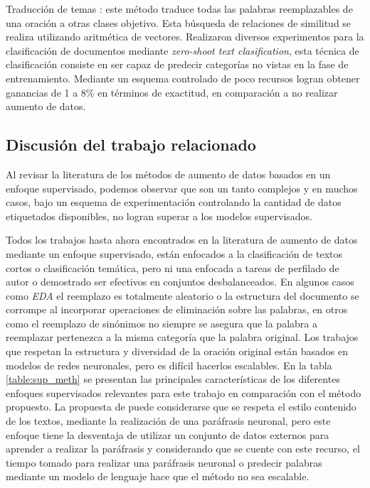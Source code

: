 Traducción de temas \citep{zhang2019integrating}: este método traduce todas las palabras reemplazables de una oración a otras clases objetivo. Esta búsqueda de relaciones de similitud se realiza utilizando aritmética de vectores. Realizaron diversos experimentos para la clasificación de documentos mediante \textit{zero-shoot text clasification}, esta técnica de clasificación consiste en ser capaz de predecir categorías no vistas en la fase de entrenamiento. Mediante un esquema controlado de poco recursos logran obtener ganancias de 1 a 8\% en términos de exactitud, en comparación a no realizar aumento de datos.


\subsection{Discusión del trabajo relacionado}

Al revisar la literatura de los métodos de aumento de datos basados en un enfoque supervisado, podemos observar que son un tanto complejos y en muchos casos, bajo un esquema de experimentación controlando la cantidad de datos etiquetados disponibles, no logran superar a los modelos supervisados.

Todos los trabajos hasta ahora encontrados en la literatura de aumento de datos mediante un enfoque supervisado, están enfocados a la clasificación de textos cortos o clasificación temática, pero ni una enfocada a tareas de perfilado de autor o demostrado ser efectivos en conjuntos desbalanceados. En algunos casos como \textit{EDA} el reemplazo es totalmente aleatorio o la estructura del documento se corrompe al incorporar operaciones de eliminación sobre las palabras, en otros como el reemplazo de sinónimos no siempre se asegura que la palabra a reemplazar pertenezca a la misma categoría que la palabra original. Los trabajos que respetan la estructura y diversidad de la oración original están basados en modelos de redes neuronales, pero es difícil hacerlos escalables. En la tabla \ref{table:sup_meth} se presentan las principales características de los diferentes enfoques supervisados relevantes para este trabajo en comparación con el método propuesto. La propuesta de \cite{kumar2019submodular} puede considerarse que se respeta el estilo contenido de los textos, mediante la realización de una paráfrasis neuronal, pero este enfoque tiene la desventaja de utilizar un conjunto de datos externos para aprender a realizar la paráfrasis y considerando que se cuente con este recurso, el tiempo tomado para realizar una paráfrasis neuronal o predecir palabras mediante un modelo de lenguaje hace que el método no sea escalable.

